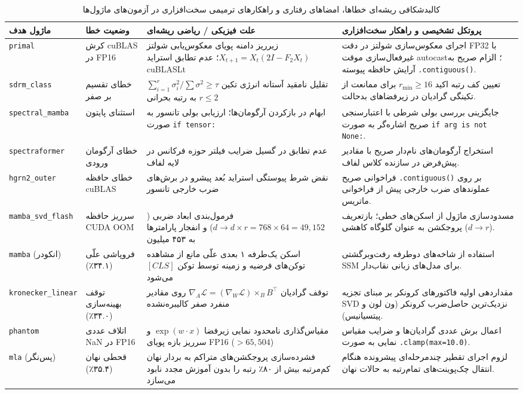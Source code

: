 \begin{table}[H]
\centering
\caption{کالبدشکافی ریشه‌ای خطاها، امضاهای رفتاری و راهکارهای ترمیمی سخت‌افزاری در آزمون‌های ماژول‌ها}
\label{tab:failure_forensics_persian}
\scriptsize
\setlength{\tabcolsep}{4pt}
\begin{tabular}{p{2.2cm}p{2.0cm}p{4.5cm}p{4.5cm}}
\toprule
\textbf{ماژول هدف} & \textbf{وضعیت خطا} & \textbf{علت فیزیکی / ریاضی ریشه‌ای} & \textbf{پروتکل تشخیصی و راهکار سخت‌افزاری} \\
\midrule
\texttt{primal} & کرش cuBLAS در FP16 & زیرریز دامنه پویای معکوس‌یابی شولتز $X_{t+1} = X_t (2I - F_2 X_t)$؛ عدم تطابق استراید cuBLASLt & اجرای معکوس‌سازی شولتز در دقت FP32 با غیرفعال‌سازی موقت autocast؛ الزام صریح به آرایش حافظه پیوسته \texttt{.contiguous()}. \\
\texttt{sdrm\_class} & خطای تقسیم بر صفر & تقلیل نامقید آستانه انرژی تکین $\sum_{i=1}^r \sigma_i^2 / \sum \sigma^2 \ge \tau$ به رتبه بحرانی $r \le 2$ & تعیین کف رتبه اکید $r_{\min} \ge 16$ برای ممانعت از تکینگی گرادیان در زیرفضاهای بدحالت. \\
\texttt{spectral\_mamba} & استثنای پایتون & ابهام در بازکردن آرگومان‌ها؛ ارزیابی بولی تانسور به صورت \texttt{if tensor:} & جایگزینی بررسی بولی شرطی با اعتبارسنجی صریح اشاره‌گر به صورت \texttt{if arg is not None:}. \\
\texttt{spectraformer} & خطای آرگومان ورودی & عدم تطابق در گسیل ضرایب فیلتر حوزه فرکانس در لایه لفاف & استخراج آرگومان‌های نام‌دار صریح با مقادیر پیش‌فرض در سازنده کلاس لفاف. \\
\texttt{hgrn2\_outer} & خطای حافظه cuBLAS & نقض شرط پیوستگی استراید بُعد پیشرو در برش‌های ضرب خارجی تانسور & فراخوانی صریح \texttt{.contiguous()} بر روی عملوندهای ضرب خارجی پیش از فراخوانی ماتریس. \\
\texttt{mamba\_svd\_flash} & سرریز حافظه CUDA OOM & فرمول‌بندی ابعاد ضربی ($d \to d \times r = 768 \times 64 = 49,152$) و انفجار پارامترها به ۴۵۳ میلیون & مسدودسازی ماژول از اسکن‌های خطی؛ بازتعریف پروجکشن به عنوان گلوگاه کاهشی ($d \to r$). \\
\texttt{mamba} (انکودر) & فروپاشی علّی (۳۴.۱٪) & اسکن یک‌طرفه ۱ بعدی علّی مانع از مشاهده توکن‌های فرضیه و زمینه توسط توکن $[CLS]$ می‌شود & استفاده از شاخه‌های دوطرفه رفت‌وبرگشتی SSM برای مدل‌های زبانی نقاب‌دار. \\
\texttt{kronecker\_linear} & توقف بهینه‌سازی (۳۴.۰٪) & توقف گرادیان $\nabla_A \mathcal{L} = (\nabla_W \mathcal{L}) \times_B B^\top$ روی مقادیر منفرد صفر کالیبره‌نشده & مقداردهی اولیه فاکتورهای کرونکر بر مبنای تجزیه SVD نزدیک‌ترین حاصل‌ضرب کرونکر (ون لون و پیتسیانیس). \\
\texttt{phantom} & اتلاف عددی NaN در FP16 & مقیاس‌گذاری نامحدود نمایی زیرفضا $\exp(w \cdot x)$ و سرریز بازه پویای FP16 ($>65,504$) & اعمال برش عددی گرادیان‌ها و ضرایب مقیاس نمایی به صورت \texttt{.clamp(max=10.0)}. \\
\texttt{mla} (پس‌نگر) & قحطی نهان (۳۵.۴٪) & فشرده‌سازی پروجکشن‌های متراکم به بردار نهان کم‌مرتبه بیش از ۸۰٪ رتبه را بدون آموزش مجدد نابود می‌سازد & لزوم اجرای تقطیر چندمرحله‌ای پیشرونده هنگام انتقال چک‌پوینت‌های تمام‌رتبه به حالات نهان. \\
\bottomrule
\end{tabular}
\end{table}

